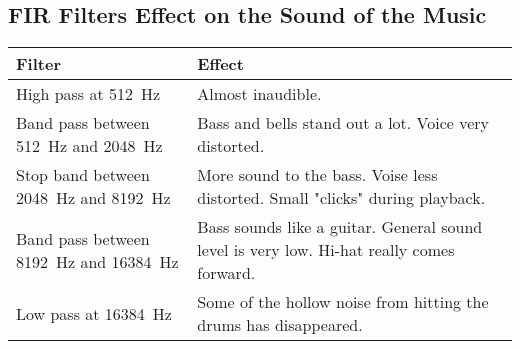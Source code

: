 \subsection{FIR Filters Effect on the Sound of the Music}
\begin{table}[!htb]
	\begin{tabularx}{\textwidth}{X X}
		Filter & Effect \\
		\midrule
		High pass at \SI{512}{\hertz} & Almost inaudible. \\
		Band pass between \SI{512}{\hertz} and \SI{2048}{\hertz} & Bass and bells stand out a lot. Voice very distorted.\\
		Stop band between \SI{2048}{\hertz} and \SI{8192}{\hertz} & More sound to the bass. Voise less distorted. Small "clicks" during playback. \\
		Band pass between \SI{8192}{\hertz} and \SI{16384}{\hertz} & Bass sounds like a guitar. General sound level is very low. Hi-hat really comes forward.\\
		Low pass at \SI{16384}{\hertz} & Some of the hollow noise from hitting the drums has disappeared.\\
	\end{tabularx}
\end{table}